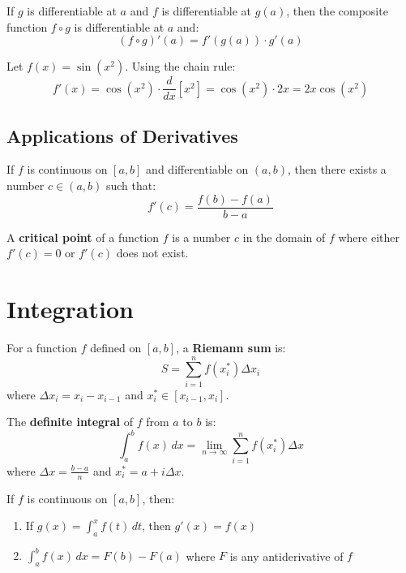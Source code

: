 \begin{theorem}
If $g$ is differentiable at $a$ and $f$ is differentiable at $g(a)$, then the composite function $f \circ g$ is differentiable at $a$ and:
\[(f \circ g)'(a) = f'(g(a)) \cdot g'(a)\]
\end{theorem}

\begin{example}
Let $f(x) = \sin(x^2)$. Using the chain rule:
\[f'(x) = \cos(x^2) \cdot \frac{d}{dx}[x^2] = \cos(x^2) \cdot 2x = 2x\cos(x^2)\]
\end{example}

\subsection{Applications of Derivatives}

\begin{theorem}
If $f$ is continuous on $[a, b]$ and differentiable on $(a, b)$, then there exists a number $c \in (a, b)$ such that:
\[f'(c) = \frac{f(b) - f(a)}{b - a}\]
\end{theorem}

\begin{definition}
A \textbf{critical point} of a function $f$ is a number $c$ in the domain of $f$ where either $f'(c) = 0$ or $f'(c)$ does not exist.
\end{definition}

\section{Integration}

\begin{definition}
For a function $f$ defined on $[a, b]$, a \textbf{Riemann sum} is:
\[S = \sum_{i=1}^{n} f(x_i^*) \Delta x_i\]
where $\Delta x_i = x_i - x_{i-1}$ and $x_i^* \in [x_{i-1}, x_i]$.
\end{definition}

\begin{definition}
The \textbf{definite integral} of $f$ from $a$ to $b$ is:
\[\int_a^b f(x) \, dx = \lim_{n \to \infty} \sum_{i=1}^{n} f(x_i^*) \Delta x\]
where $\Delta x = \frac{b-a}{n}$ and $x_i^* = a + i \Delta x$.
\end{definition}

\begin{theorem}
If $f$ is continuous on $[a, b]$, then:
\begin{enumerate}
    \item If $g(x) = \int_a^x f(t) \, dt$, then $g'(x) = f(x)$
    \item $\int_a^b f(x) \, dx = F(b) - F(a)$ where $F$ is any antiderivative of $f$
\end{enumerate}
\end{theorem}

